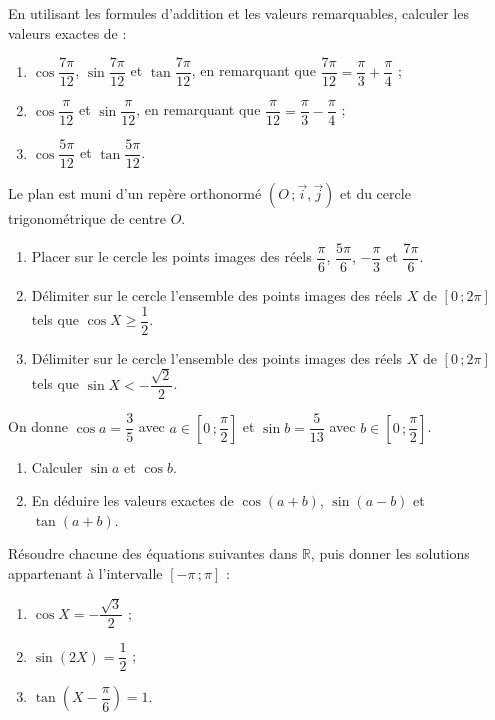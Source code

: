 \documentclass[11pt]{article}
\newcounter{popsec}
\newcounter{popsub}
\newcommand{\courssub}[1]{%
  \stepcounter{popsub}%
  \par\vspace{9pt}\noindent{\popxbold\fontsize{11.5}{13}\selectfont\color{popink}{\color{poporange}\thepopsec.\thepopsub}\hspace{6pt}#1}\par\nopagebreak\vspace{4pt}
}
\begin{document}
\begin{exercice}
En utilisant les formules d'addition et les valeurs remarquables, calculer les valeurs exactes de :
\begin{enumerate}
\item $\cos\dfrac{7\pi}{12}$, $\sin\dfrac{7\pi}{12}$ et $\tan\dfrac{7\pi}{12}$, en remarquant que $\dfrac{7\pi}{12}=\dfrac{\pi}{3}+\dfrac{\pi}{4}$ ;
\item $\cos\dfrac{\pi}{12}$ et $\sin\dfrac{\pi}{12}$, en remarquant que $\dfrac{\pi}{12}=\dfrac{\pi}{3}-\dfrac{\pi}{4}$ ;
\item $\cos\dfrac{5\pi}{12}$ et $\tan\dfrac{5\pi}{12}$.
\end{enumerate}
\end{exercice}

\begin{exercice}
Le plan est muni d'un repère orthonormé $(O\,;\vec{i},\vec{j})$ et du cercle trigonométrique de centre $O$.
\begin{enumerate}
\item Placer sur le cercle les points images des réels $\dfrac{\pi}{6}$, $\dfrac{5\pi}{6}$, $-\dfrac{\pi}{3}$ et $\dfrac{7\pi}{6}$.
\item Délimiter sur le cercle l'ensemble des points images des réels $X$ de $[0\,;2\pi]$ tels que $\cos X\geq \dfrac{1}{2}$.
\item Délimiter sur le cercle l'ensemble des points images des réels $X$ de $[0\,;2\pi]$ tels que $\sin X<-\dfrac{\sqrt{2}}{2}$.
\end{enumerate}
\end{exercice}

\courssub{Je m'entraîne}

\begin{exercice}
On donne $\cos a=\dfrac{3}{5}$ avec $a\in\left[0\,;\dfrac{\pi}{2}\right]$ et $\sin b=\dfrac{5}{13}$ avec $b\in\left[0\,;\dfrac{\pi}{2}\right]$.
\begin{enumerate}
\item Calculer $\sin a$ et $\cos b$.
\item En déduire les valeurs exactes de $\cos(a+b)$, $\sin(a-b)$ et $\tan(a+b)$.
\end{enumerate}
\end{exercice}

\begin{exercice}
Résoudre chacune des équations suivantes dans $\mathbb{R}$, puis donner les solutions appartenant à l'intervalle $[-\pi\,;\pi]$ :
\begin{enumerate}
\item $\cos X=-\dfrac{\sqrt{3}}{2}$ ;
\item $\sin(2X)=\dfrac{1}{2}$ ;
\item $\tan\left(X-\dfrac{\pi}{6}\right)=1$.
\end{enumerate}
\end{exercice}
\end{document}
